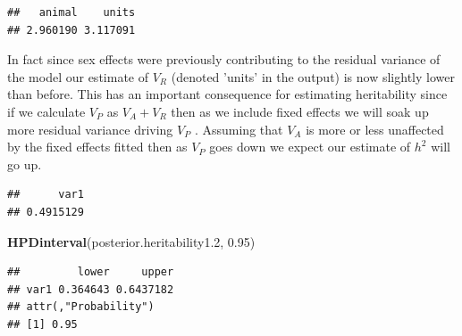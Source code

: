 \documentclass[
  12pt,
]{book}
\newenvironment{Shaded}{\begin{snugshade}}{\end{snugshade}}
\newcommand{\FloatTok}[1]{\textcolor[rgb]{0.00,0.00,0.81}{#1}}
\newcommand{\KeywordTok}[1]{\textcolor[rgb]{0.13,0.29,0.53}{\textbf{#1}}}
\newcommand{\NormalTok}[1]{#1}
\newcommand{\OperatorTok}[1]{\textcolor[rgb]{0.81,0.36,0.00}{\textbf{#1}}}
\newcommand{\StringTok}[1]{\textcolor[rgb]{0.31,0.60,0.02}{#1}}
\begin{document}
\begin{Shaded}
\end{Shaded}

\begin{verbatim}
##   animal    units 
## 2.960190 3.117091
\end{verbatim}

In fact since sex effects were previously contributing to the residual variance of the model our estimate of \(V_R\) (denoted 'units' in the output) is now slightly lower than before. This has an important consequence for estimating heritability since if we calculate \(V_P\) as \(V_A +V_R\) then as we include fixed effects we will soak up more residual variance driving \(V_P\) . Assuming that \(V_A\) is more or less unaffected by the fixed effects fitted then as \(V_P\) goes down we expect our estimate of \(h^2\) will go up.

\begin{Shaded}
\end{Shaded}

\begin{verbatim}
##      var1 
## 0.4915129
\end{verbatim}

\begin{Shaded}
\begin{Highlighting}[]
\KeywordTok{HPDinterval}\NormalTok{(posterior.heritability1}\FloatTok{.2}\NormalTok{, }\FloatTok{0.95}\NormalTok{)}
\end{Highlighting}
\end{Shaded}

\begin{verbatim}
##         lower     upper
## var1 0.364643 0.6437182
## attr(,"Probability")
## [1] 0.95
\end{verbatim}
\end{document}
